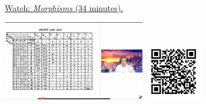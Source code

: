 
\begin{minipage}{10cm}
    \href{https://act4e-spring21.netlify.app/videos/spring2021-morphisms:morphisms.html}{Watch: \emph{Morphisms} (34 minutes).}
        
    \href{https://act4e-spring21.netlify.app/videos/spring2021-morphisms:morphisms.html}{\includegraphics[height=3.5cm]{spring2021-morphisms:morphisms/thumbnails.jpg}}
    \href{https://act4e-spring21.netlify.app/videos/spring2021-morphisms:morphisms.html}{\includegraphics[height=2.5cm]{spring2021-morphisms:morphisms/qrcode.png}}
\end{minipage}
